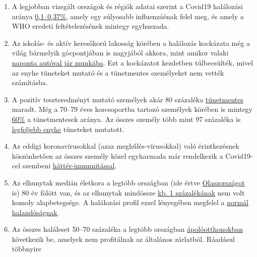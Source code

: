\begin{enumerate}
\def\labelenumi{\arabic{enumi}.}
\tightlist
\item
  A legjobban vizsgált országok és régiók adatai szerint a Covid19
  halálozási aránya
  \href{https://swprs.org/studies-on-covid-19-lethality/}{0,1--0,37\%},
  amely egy súlyosabb influenzáénak felel meg, és amely a WHO eredeti
  feltételezésének mintegy egyhuszada.
\item
  Az iskolás- és aktív keresőkorú lakosság körében a halálozás kockázata
  még a világ bármelyik gócpontjában is nagyjából akkora, mint amikor
  valaki
  \href{https://www.medrxiv.org/content/10.1101/2020.04.05.20054361v1}{naponta
  autóval jár munkába}. Ezt a kockázatot kezdetben túlbecsülték, mivel
  az enyhe tüneteket mutató és a tünetmentes személyeket nem vették
  számításba.
\item
  A pozitív teszteredményt mutató személyek akár 80 százaléka
  \href{https://www.bmj.com/content/369/bmj.m1375}{tünetmentes} maradt.
  Még a 70--79 éves korcsoportba tartozó személyek körében is mintegy
  \href{https://www.niid.go.jp/niid/en/2019-ncov-e/9407-covid-dp-fe-01.html}{60\%}
  a tünetmentesek aránya. Az összes személy több mint 97 százaléka is
  \href{https://swprs.org/studies-on-covid-19-lethality/\#hospitalizations}{legfeljebb
  enyhe} tüneteket mutatott.
\item
  Az eddigi koronavírusokkal (azaz meghűlés-vírusokkal) való
  érintkezésnek köszönhetően az összes személy közel egyharmada már
  rendelkezik a Covid19-cel szembeni
  \href{https://www.medrxiv.org/content/10.1101/2020.04.17.20061440v1}{háttér-immunitással}.
\item
  Az elhunytak medián életkora a legtöbb országban (ide értve
  \href{https://www.epicentro.iss.it/coronavirus/sars-cov-2-decessi-italia}{Olaszországot}
  is) 80 év fölött van, és az elhunytak mindössze
  \href{https://www.bloomberg.com/news/articles/2020-03-18/99-of-those-who-died-from-virus-had-other-illness-italy-says}{kb.
  1 százalékának} nem volt komoly alapbetegsége. A halálozási profil
  ezzel lényegében megfelel a
  \href{https://www.vienna.at/analyse-zeigt-covid-19-opferkurve-entspricht-normaler-mortalitaet/6581246}{normál
  halandóságnak}.
\item
  Az összes haláleset 50--70 százaléka a legtöbb országban
  \href{https://ltccovid.org/2020/04/12/mortality-associated-with-covid-19-outbreaks-in-care-homes-early-international-evidence/}{ápolóotthonokban}
  következik be, amelyek nem profitálnak az általános zárlatból.
  Ráadásul többnyire

\end{enumerate}
